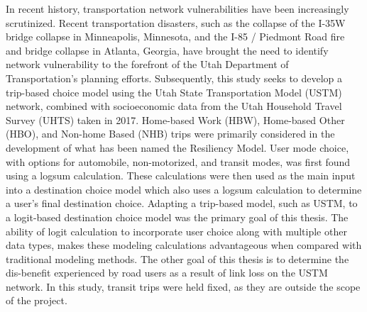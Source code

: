\afterpage{\cleardoublepage}

In recent history, transportation network vulnerabilities have been increasingly
scrutinized. Recent transportation disasters, such as the collapse of the I-35W
bridge collapse in Minneapolis, Minnesota, and the I-85 / Piedmont Road fire
and bridge collapse in Atlanta, Georgia, have brought the need to identify
network vulnerability to the forefront of the Utah Department of Transportation's
planning efforts. Subsequently, this study seeks to develop a trip-based
choice model using the Utah State Transportation Model (USTM) network, combined
with socioeconomic data from the Utah Household Travel Survey (UHTS) taken in
2017. Home-based Work (HBW), Home-based Other (HBO), and Non-home Based (NHB)
trips were primarily considered in the development of what has been named the
Resiliency Model. User mode
choice, with options for automobile, non-motorized, and transit modes, was first
found using a logsum calculation. These calculations were then used as the main
input into a destination choice model which also uses a logsum calculation to
determine a user's final destination choice. Adapting a trip-based model,
such as USTM, to a logit-based destination choice model was the primary goal of
this thesis. The ability of logit calculation to incorporate user choice along
with multiple other data types, makes these modeling calculations advantageous
when compared with
traditional modeling methods. The other goal of this thesis is to determine the
dis-benefit experienced by road users as a result of link loss on the USTM
network. In this study, transit trips were held
fixed, as they are outside the scope of the project.
